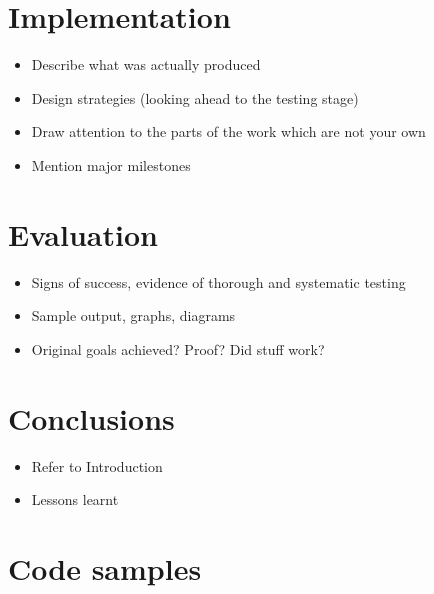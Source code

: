 \documentclass[11pt,chapterprefix=true,toc=bibliography,numbers=noendperiod]{scrreprt}
\begin{document}
\chapter{Implementation%
  \label{implementation}%
}

\begin{itemize}
    \item Describe what was actually produced
    \item Design strategies (looking ahead to the testing stage)
    \item Draw attention to the parts of the work which are not your own
    \item Mention major milestones
\end{itemize}

\chapter{Evaluation%
  \label{evaluation}%
}

\begin{itemize}
    \item Signs of success, evidence of thorough and systematic testing
    \item Sample output, graphs, diagrams
    \item Original goals achieved? Proof? Did stuff work?
\end{itemize}

\chapter{Conclusions%
  \label{conclusions}%
}

\begin{itemize}
    \item Refer to Introduction
    \item Lessons learnt
\end{itemize}




\appendix

\chapter{Code samples%
  \label{code-samples}%
}
\end{document}
